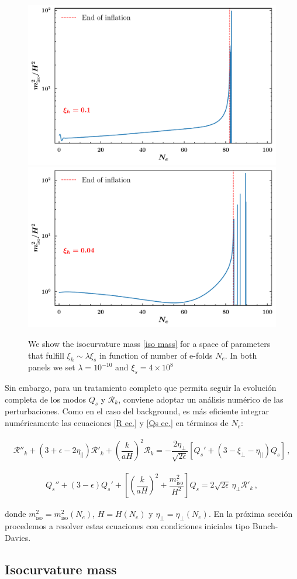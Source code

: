 \documentclass[12pt,a4paper,english,nofootinbib]{revtex4}
\newcommand{\beq}{\begin{eqnarray}}
\newcommand{\enq}{\end{eqnarray}}
\begin{document}
\begin{figure}[htp]
    \centering
    \includegraphics[width = 0.48 \textwidth]{Figures/isomass1.pdf}
    \includegraphics[width = 0.48 \textwidth]{Figures/isomass2.pdf}
    \caption{We show the isocurvature mass \eqref{iso mass} for a space of parameters that fulfill $\xi_h \sim \lambda \xi_s$ in function of number of e-folds $N_e$. In both panels we set $\lambda = 10^{-10}$ and $\xi_s = 4\times 10^{8}$}
    \label{fig3}
\end{figure}

Sin embargo, para un tratamiento completo que permita seguir la evolución completa de los modos $Q_s$ y $\mathcal{R}_k$, conviene adoptar un análisis numérico de las perturbaciones. Como en el caso del background, es más eficiente integrar numéricamente las ecuaciones \eqref{R ec.} y \eqref{Qs ec.} en términos de $N_e$:

\beq
    \mathcal{R}''_k + (3 + \epsilon - 2\eta_{||})\mathcal{R}'_k + \left(\dfrac{k}{aH}\right)^2 \mathcal{R}_k = -\dfrac{2\eta_\perp}{\sqrt{2\epsilon}}[Q_s' + (3-\xi_\perp - \eta_{||})Q_s]\,,
\enq


\beq
    Q_s'' + (3-\epsilon)Q_s' + \left[\left(\dfrac{k}{aH}\right)^2 + \dfrac{m_\text{iso}^2}{H^2} \right]Q_s = 2\sqrt{2\epsilon}\, \eta_\perp\mathcal{R}'_k\,,
\enq

donde $m_\text{iso}^2 = m_\text{iso}^2(N_e)$, $H = H(N_e)$ y $\eta_\perp = \eta_\perp(N_e)$. En la próxima sección procedemos a resolver estas ecuaciones con condiciones iniciales tipo Bunch-Davies.





\subsection{Isocurvature mass}
\end{document}
